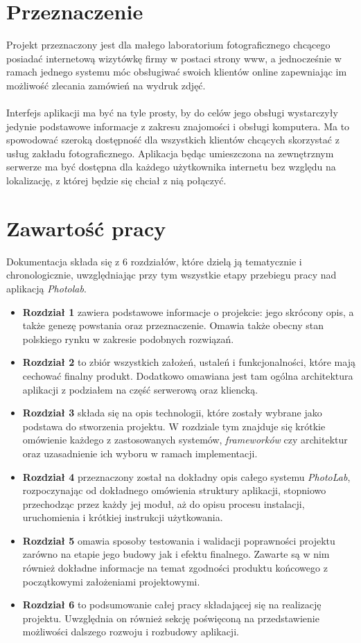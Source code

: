 \section{Przeznaczenie}

\quad Projekt przeznaczony jest dla małego laboratorium fotograficznego chcącego posiadać internetową wizytówkę firmy w postaci strony www, a jednocześnie w ramach jednego systemu móc obsługiwać swoich klientów online zapewniając im możliwość zlecania zamówień na wydruk zdjęć. \\
\\
Interfejs aplikacji ma być na tyle prosty, by do celów jego obsługi wystarczyły jedynie podstawowe informacje z zakresu znajomości i obsługi komputera. Ma to spowodować szeroką dostępność dla wszystkich klientów chcących skorzystać z usług zakładu fotograficznego. Aplikacja będąc umieszczona na zewnętrznym serwerze ma być dostępna dla każdego użytkownika internetu bez względu na lokalizację, z której będzie się chciał z nią połączyć.

\section{Zawartość pracy}
\quad Dokumentacja składa się z 6 rozdziałów, które dzielą ją tematycznie i chronologicznie, uwzględniając przy tym wszystkie etapy przebiegu pracy nad aplikacją \textit{Photolab}.

\begin{itemize}
\item \textbf{Rozdział 1} zawiera podstawowe informacje o projekcie: jego skrócony opis, a także genezę powstania oraz przeznaczenie. Omawia także obecny stan polskiego rynku
w zakresie podobnych rozwiązań.
\item \textbf{Rozdział 2} to zbiór wszystkich założeń, ustaleń i funkcjonalności, które mają cechować finalny produkt. Dodatkowo omawiana jest tam ogólna architektura aplikacji z podziałem na część serwerową oraz kliencką.
\item \textbf{Rozdział 3} składa się na opis technologii, które zostały wybrane jako podstawa do stworzenia projektu. W rozdziale tym znajduje się krótkie omówienie każdego z zastosowanych systemów, \textit{frameworków} czy architektur oraz uzasadnienie ich wyboru w ramach implementacji.
\item \textbf{Rozdział 4} przeznaczony został na dokładny opis całego systemu \textit{PhotoLab}, rozpoczynając od dokładnego omówienia struktury aplikacji, stopniowo przechodząc przez każdy jej moduł, aż do opisu procesu instalacji, uruchomienia i krótkiej instrukcji użytkowania.
\item \textbf{Rozdział 5} omawia sposoby testowania i walidacji poprawności projektu zarówno na etapie jego budowy jak i efektu finalnego. Zawarte są w nim również dokładne informacje na temat zgodności produktu końcowego z początkowymi założeniami projektowymi.
\item \textbf{Rozdział 6} to podsumowanie całej pracy składającej się na realizację projektu. Uwzględnia on również sekcję poświęconą na przedstawienie możliwości dalszego rozwoju i rozbudowy aplikacji.
\end{itemize}
